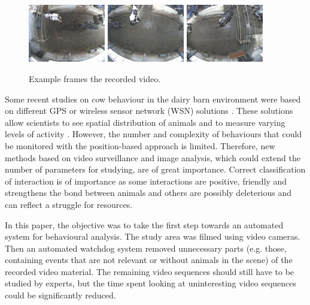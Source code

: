 \documentclass{cta-author}
\begin{document}
\begin{figure}[b]
\begin{center}
  \includegraphics[width=0.3\textwidth]{old-2.jpg}
  \includegraphics[width=0.3\textwidth]{old-1.jpg}
  \includegraphics[width=0.3\textwidth]{old-0.jpg}
\end{center}
  \caption{Example frames the recorded video.}
  \label{fig:old}
\end{figure}


Some recent studies on cow behaviour in the dairy barn environment were based on different GPS or wireless sensor network (WSN) solutions \cite{Nadimietal2012}. These solutions allow scientists to see spatial distribution of animals and to measure varying levels of activity \cite{Nadimietal2012}. However, the number and complexity of behaviours that could be monitored with the position-based approach is limited. Therefore, new methods based on video surveillance and image analysis, which could extend the number of parameters for studying, are of great importance. Correct classification of interaction is of importance as some interactions are positive, friendly and strengthens the bond between animals and others are possibly deleterious and can reflect a struggle for resources.

In this paper, the objective was to take the first step towards an automated system for behavioural analysis. The study area was filmed using video cameras. Then an automated watchdog system removed unnecessary parts (e.g. those, containing events that are not relevant or without animals in the scene) of the recorded video material. The remaining video sequences should still have to be studied by experts, but the time spent looking at uninteresting video sequences could be significantly reduced. 
\end{document}
